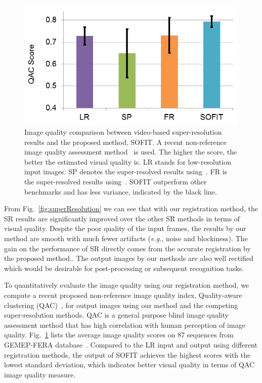 \documentclass[10pt,journal]{IEEEtran}
\begin{document}
\begin{figure}[t]
	\centering
		\includegraphics[width=.8\columnwidth]{fig/SR_quant.png}
	\caption{Image quality comparison between video-based super-resolution results and the proposed method, SOFIT. A recent non-reference image quality assessment method~\cite{Xue_CVPR13} is used. The higher the score, the better the estimated visual quality is. LR stands for low-resolution input images. SP denotes the super-resolved results using~\cite{Keren_CVPR88}. FR is the super-resolved results using~\cite{Vandewalle06}. SOFIT outperform other benchmarks and has less variance, indicated by the black line. }
	\label{fig:SR_quant}
\end{figure}


From Fig.~\ref{fig:superResolution} we can see that with our registration method, the SR results are significantly improved over the other SR methods in terms of visual quality. Despite the poor quality of the input frames, the results by our method are smooth with much fewer artifacts (\textit{e.g.}, noise and blockiness). The gain on the performance of SR directly comes from the accurate registration by the proposed method.. The output images by our methods are also well rectified which would be desirable for post-processing or subsequent recognition tasks. 




To quantitatively evaluate the image quality using our registration method, we compute a recent proposed non-reference image quality index, Quality-aware clustering (QAC)~\cite{Xue_CVPR13}, for output images using our method and the competing super-resolution methods. QAC is a general purpose blind image quality assessment method that has high correlation with human perception of image quality. Fig.~\ref{fig:SR_quant} lists the average image quality scores on 87 sequences from GEMEP-FERA database~\cite{FERA11}. Compared to the LR input and output using different registration methods, the output of SOFIT achieves the highest scores with the lowest standard deviation, which indicates better visual quality in terms of QAC image quality measure.
\end{document}
